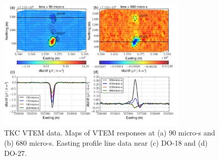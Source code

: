 \documentclass[letterpaper,11pt]{article}
\begin{document}
\begin{figure}[htb]
  \centering
  \includegraphics[width=0.8\textwidth]{figures/TKCvtem.png}
  \caption{TKC VTEM data. Maps of VTEM responses at (a) 90 micro-s and (b) 680 micro-s. Easting profile line data near (c) DO-18 and (d) DO-27. }
  \label{Fig:TKCvtem}
\end{figure}
\clearpage

\end{document}
